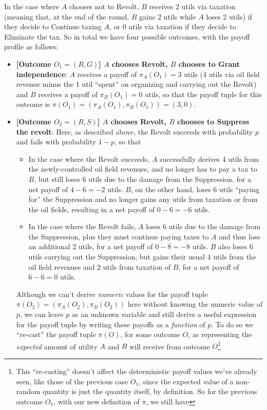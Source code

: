In the case where $A$ chooses not to Revolt, $B$ receives 2 utils via taxation (meaning that, at the end of the round, $B$ gains 2 utils while $A$ loses 2 utils) if they decide to Continue taxing $A$, or 0 utils via taxation if they decide to Eliminate the tax. So in total we have four possible outcomes, with the payoff profile as follows:
\begin{itemize}
	\item \textbf{[Outcome $O_1 = (R,G)$] $A$ chooses Revolt, $B$ chooses to Grant independence}: $A$ receives a payoff of $\pi_A(O_1) = 3$ utils (4 utils via oil field revenue minus the 1 util ``spent'' on organizing and carrying out the Revolt) and $B$ receives a payoff of $\pi_B(O_1) = 0$ utils, so that the payoff tuple for this outcome is $\pi(O_1) = (\pi_A(O_1),\pi_B(O_1)) = (3,0)$.
	\item \textbf{[Outcome $O_2 = (R,S)$] $A$ chooses Revolt, $B$ chooses to Suppress the revolt}: Here, as described above, the Revolt succeeds with probability $p$ and fails with probability $1-p$, so that
	\begin{itemize}
		\item In the case where the Revolt succeeds, $A$ successfully derives 4 utils from the newly-controlled oil field revenues, and no longer has to pay a tax to $B$, but still loses 6 utils due to the damage from the Suppression, for a net payoff of $4-6 = -2$ utils. $B$, on the other hand, loses 6 utils ``paying for'' the Suppression and no longer gains any utils from taxation or from the oil fields, resulting in a net payoff of $0-6 = -6$ utils.
		\item In the case where the Revolt fails, $A$ loses 6 utils due to the damage from the Suppression, plus they must continue paying taxes to $A$ and thus lose an additional 2 utils, for a net payoff of $0-8 = -8$ utils. $B$ also loses 6 utils carrying out the Suppression, but gains their usual 4 utils from the oil field revenues and 2 utils from taxation of $B$, for a net payoff of $6-6 = 0$ utils.
	\end{itemize}
	Although we can't derive \textit{numeric} values for the payoff tuple $\pi(O_2) = (\pi_A(O_2), \pi_B(O_2))$ here without knowing the numeric value of $p$, we can leave $p$ as an unknown variable and still derive a useful expression for the payoff tuple by writing these payoffs as a \textit{function} of $p$. To do so we ``re-cast'' the payoff tuple $\pi(O)$, for some outcome $O$, as representing the \textit{expected} amount of utility $A$ and $B$ will receive from outcome $O$\footnote{This ``re-casting'' doesn't affect the deterministic payoff values we've already seen, like those of the previous case $O_1$, since the expected value of a non-random quantity is just the quantity itself, by definition. So for the previous outcome $O_1$, with our new definition of $\pi$, we still have
}
\end{itemize}
